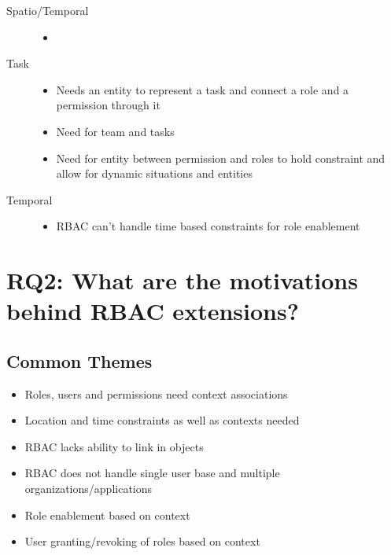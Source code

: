 \documentclass[letterpaper,10pt,english]{sphinxmanual}
\begin{document}
\begin{description}
\begin{itemize}
\end{itemize}

\item[{Spatio/Temporal}] \leavevmode\begin{itemize}
\item {} 
\end{itemize}

\item[{Task}] \leavevmode\begin{itemize}
\item {} 
Needs an entity to represent a task and connect a role and a permission through it

\item {} 
Need for team and tasks

\item {} 
Need for entity between permission and roles to hold constraint and allow for dynamic situations and entities

\end{itemize}

\item[{Temporal}] \leavevmode\begin{itemize}
\item {} 
RBAC can't handle time based constraints for role enablement

\end{itemize}

\end{description}


\chapter{RQ2: What are the motivations behind RBAC extensions?}
\label{research_questions/RQ_2:rq2-what-are-the-motivations-behind-rbac-extensions}\label{research_questions/RQ_2::doc}

\section{Common Themes}
\label{research_questions/RQ_2:common-themes}\begin{itemize}
\item {} 
Roles, users and permissions need context associations

\item {} 
Location and time constraints as well as contexts needed

\item {} 
RBAC lacks ability to link in objects

\item {} 
RBAC does not handle single user base and multiple organizations/applications

\item {} 
Role enablement based on context

\item {} 
User granting/revoking of roles based on context

\end{itemize}
\end{document}
